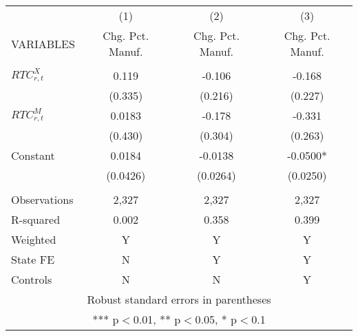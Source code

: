 \begin{tabular}{lccc} \hline
 & (1) & (2) & (3) \\
VARIABLES & Chg. Pct. Manuf. & Chg. Pct. Manuf. & Chg. Pct. Manuf. \\ \hline
 &  &  &  \\
$ RTC_{r,t}^X$ & 0.119 & -0.106 & -0.168 \\
 & (0.335) & (0.216) & (0.227) \\
$ RTC_{r,t}^M$ & 0.0183 & -0.178 & -0.331 \\
 & (0.430) & (0.304) & (0.263) \\
Constant & 0.0184 & -0.0138 & -0.0500* \\
 & (0.0426) & (0.0264) & (0.0250) \\
 &  &  &  \\
Observations & 2,327 & 2,327 & 2,327 \\
R-squared & 0.002 & 0.358 & 0.399 \\
Weighted & Y & Y & Y \\
State FE & N & Y & Y \\
 Controls & N & N & Y \\ \hline
\multicolumn{4}{c}{ Robust standard errors in parentheses} \\
\multicolumn{4}{c}{ *** p$<$0.01, ** p$<$0.05, * p$<$0.1} \\
\end{tabular}
